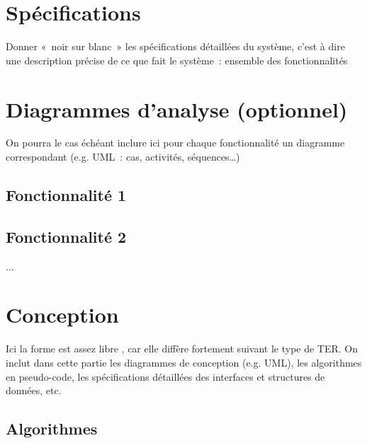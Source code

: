 \documentclass[a4paper,12pt]{article}
\begin{document}
  \begin{titlepage}
   \def\titletype{Analyse et conception}
   
  \end{titlepage}

  
  \clearpage

  \tableofcontents
  

  \clearpage
  
  \renewcommand{\labelitemi}{$\bullet$}
  \renewcommand{\labelitemii}{$\circ$}
  \renewcommand{\labelitemiii}{$\diamond$}
  \renewcommand{\labelitemiv}{$\ast$}
  
  \section{Spécifications}
  Donner « noir sur blanc » les spécifications détaillées du système, 
  c’est à dire une description précise de ce que fait le système : ensemble des fonctionnalités

 
 
 
 \section{Diagrammes d’analyse (optionnel)}
  On pourra le cas échéant inclure ici pour chaque fonctionnalité un diagramme correspondant 
  (e.g. UML : cas, activités, séquences…)
    \subsection{Fonctionnalité 1}
    \subsection{Fonctionnalité 2}
    ...
  
  
  
  \section{Conception}
  Ici la forme est assez libre , car elle diffère fortement suivant le type de TER.
  On inclut dans cette partie les diagrammes de conception (e.g. UML), les algorithmes 
  en pseudo-code, les spécifications détaillées des interfaces et structures de données, etc.
  
  \subsection{Algorithmes}
  
  



\end{document}
